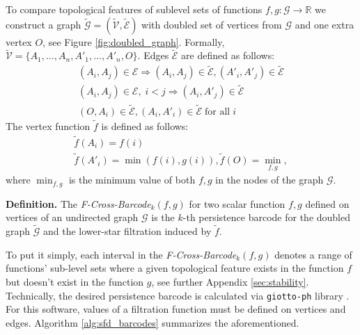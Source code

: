 \documentclass[runningheads]{llncs}
\begin{document}
To compare topological features of sublevel sets of functions $f, g: \mathcal{G} \to \mathbb{R}$ we construct a graph $\tilde{\mathcal{G}} = (\tilde{\mathcal{V}}, \tilde{\mathcal{E}})$ with doubled set of vertices from $\mathcal{G}$ and one extra vertex $O$, see Figure \ref{fig:doubled_graph}.
Formally, $\tilde{\mathcal{V}}=\{A_1, \ldots, A_n, A'_1, \ldots, A'_n, O\}$. 
Edges $\tilde{\mathcal{E}}$ are defined as follows:
\begin{gather*}
(A_i, A_j) \in \mathcal{E} \Rightarrow (A_i, A_j) \in \tilde{\mathcal{E}}, (A'_i, A'_j) \in \tilde{\mathcal{E}}  \\
(A_i, A_j) \in \mathcal{E},\; i < j \Rightarrow (A_i, A'_j) \in \tilde{\mathcal{E}} \\
(O, A_i) \in \tilde{\mathcal{E}}, (A_i, A'_i) \in \tilde{\mathcal{E}} \; \text{for all} \; i
\end{gather*}
The vertex function $\tilde{f}$ is defined as follows: 
\begin{gather*}
\tilde{f}(A_i) = f(i) \\
\tilde{f}(A'_i)= \min(f(i), g(i)), \tilde{f}(O) = {\min}_{f,g},
\end{gather*}
where $\min_{f, g}$ is the minimum value of both $f, g$ in the nodes of the graph $\mathcal{G}$. 

\textbf{Definition.} The \textit{F-Cross-Barcode}$_k(f, g)$ for two scalar function $f, g$ defined on vertices of an undirected graph $\mathcal{G}$ is the $k$-th persistence barcode for the doubled graph $\tilde{\mathcal{G}}$ and the lower-star filtration induced by $\tilde{f}$. 


To put it simply, each interval in the \textit{F-Cross-Barcode}$_k(f, g)$ denotes a range of functions’ sub-level sets where a given topological feature exists in the function $f$ but doesn’t exist in the function $g$, see further Appendix \ref{sec:stability}.
Technically, the desired persistence barcode is calculated via  \texttt{giotto-ph} library \cite{burella2021giottoph}. For this software, values of a filtration function must be defined on vertices and edges.
Algorithm \ref{alg:sfd_barcodes} summarizes the aforementioned. 
\end{document}
